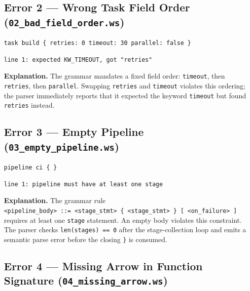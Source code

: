 \documentclass[10pt,a4paper]{article}
\begin{document}
\subsection{Error 2 --- Wrong Task Field Order (\texttt{02\_bad\_field\_order.ws})}

\begin{lstlisting}[caption={02\_bad\_field\_order.ws}]
task build { retries: 0 timeout: 30 parallel: false }
\end{lstlisting}

\begin{lstlisting}[style=error]
line 1: expected KW_TIMEOUT, got "retries"
\end{lstlisting}

\noindent\textbf{Explanation.}
The grammar mandates a fixed field order: \texttt{timeout}, then \texttt{retries},
then \texttt{parallel}.  Swapping \texttt{retries} and \texttt{timeout} violates this
ordering; the parser immediately reports that it expected the keyword \texttt{timeout}
but found \texttt{retries} instead.

\subsection{Error 3 --- Empty Pipeline (\texttt{03\_empty\_pipeline.ws})}

\begin{lstlisting}[caption={03\_empty\_pipeline.ws}]
pipeline ci { }
\end{lstlisting}

\begin{lstlisting}[style=error]
line 1: pipeline must have at least one stage
\end{lstlisting}

\noindent\textbf{Explanation.}
The grammar rule \texttt{<pipeline\_body>~::=~<stage\_stmt>~\{~<stage\_stmt>~\}~[~<on\_failure>~]}
requires at least one \texttt{stage} statement.  An empty body violates this constraint.
The parser checks \texttt{len(stages) == 0} after the stage-collection loop and emits a
semantic parse error before the closing \texttt{\}} is consumed.

\subsection{Error 4 --- Missing Arrow in Function Signature (\texttt{04\_missing\_arrow.ws})}
\end{document}
